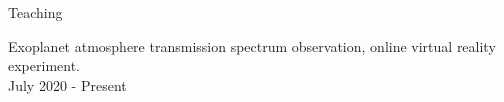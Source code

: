 \documentclass{resume} %
\begin{document}
\begin{rSection}{Teaching}

Exoplanet atmosphere transmission spectrum observation, online virtual reality experiment.\\
July 2020 - Present

\end{rSection}
%
%
\end{document}
